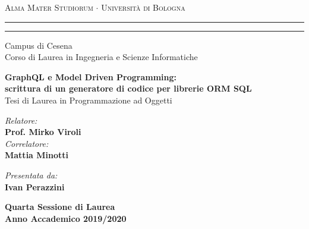 
\begin{titlepage}
\begin{center}
{{\Large{\textsc{Alma Mater Studiorum $\cdot$ Universit\`a di
Bologna}}}} \rule[0.1cm]{15.8cm}{0.1mm}
\rule[0.5cm]{15.8cm}{0.6mm}
\large{Campus di Cesena\\
Corso di Laurea in Ingegneria e Scienze Informatiche}
\end{center}
\vspace{8mm}
\begin{center}
\LARGE\textbf{GraphQL e Model Driven Programming:\\\vspace{2.5mm}scrittura di un generatore di codice per librerie ORM SQL}\\
\vspace{8mm}
\large{Tesi di Laurea in Programmazione ad Oggetti}
\par
\end{center}
\vspace{40mm}
\noindent
\begin{minipage}[t]{0.47\textwidth}
\large{\emph{Relatore:}}\\
\large\textbf{Prof. Mirko Viroli}\\
\large{\emph{Correlatore:}}\\
\large\textbf{Mattia Minotti}
\end{minipage}
\hfill
\begin{minipage}[t]{0.47\textwidth}\raggedleft
\large{\emph{Presentata da:}}\\
\large\textbf{Ivan Perazzini}
\end{minipage}
\vspace{20mm}
\begin{center}
{\large{\bf Quarta Sessione di Laurea\\%
Anno Accademico 2019/2020}}%
\end{center}
\end{titlepage}
